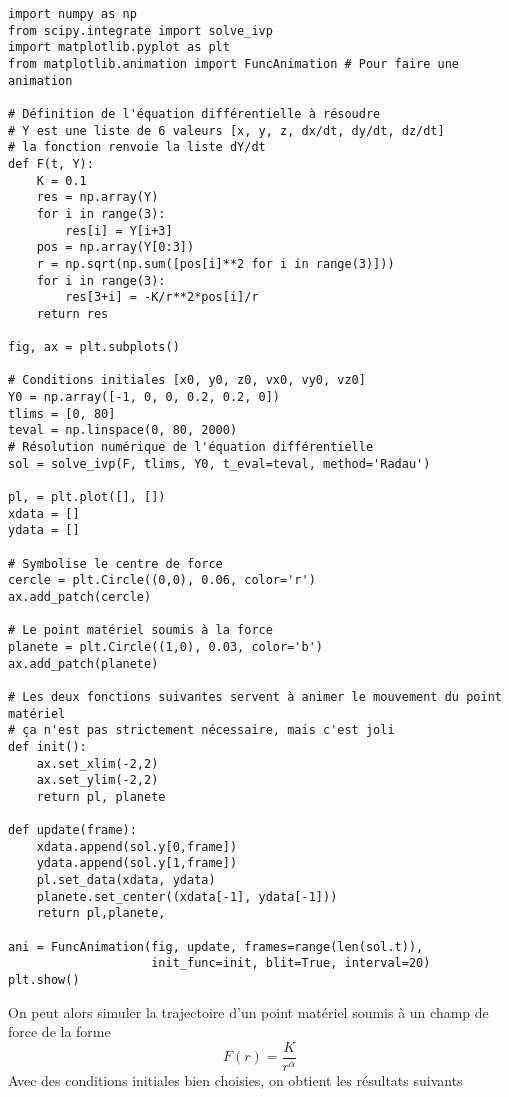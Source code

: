 \documentclass{cours}
\begin{document}
 \begin{verbatim}
import numpy as np
from scipy.integrate import solve_ivp
import matplotlib.pyplot as plt
from matplotlib.animation import FuncAnimation # Pour faire une animation

# Définition de l'équation différentielle à résoudre 
# Y est une liste de 6 valeurs [x, y, z, dx/dt, dy/dt, dz/dt]
# la fonction renvoie la liste dY/dt
def F(t, Y):
    K = 0.1
    res = np.array(Y)
    for i in range(3):
        res[i] = Y[i+3]
    pos = np.array(Y[0:3])
    r = np.sqrt(np.sum([pos[i]**2 for i in range(3)]))
    for i in range(3):
        res[3+i] = -K/r**2*pos[i]/r
    return res

fig, ax = plt.subplots()

# Conditions initiales [x0, y0, z0, vx0, vy0, vz0]
Y0 = np.array([-1, 0, 0, 0.2, 0.2, 0])
tlims = [0, 80]
teval = np.linspace(0, 80, 2000)
# Résolution numérique de l'équation différentielle
sol = solve_ivp(F, tlims, Y0, t_eval=teval, method='Radau')

pl, = plt.plot([], [])
xdata = []
ydata = []

# Symbolise le centre de force
cercle = plt.Circle((0,0), 0.06, color='r')
ax.add_patch(cercle)

# Le point matériel soumis à la force
planete = plt.Circle((1,0), 0.03, color='b')
ax.add_patch(planete)

# Les deux fonctions suivantes servent à animer le mouvement du point matériel
# ça n'est pas strictement nécessaire, mais c'est joli
def init():
    ax.set_xlim(-2,2)
    ax.set_ylim(-2,2)
    return pl, planete

def update(frame):
    xdata.append(sol.y[0,frame])
    ydata.append(sol.y[1,frame])
    pl.set_data(xdata, ydata)
    planete.set_center((xdata[-1], ydata[-1]))
    return pl,planete,

ani = FuncAnimation(fig, update, frames=range(len(sol.t)),
                    init_func=init, blit=True, interval=20)
plt.show()
 \end{verbatim}
On peut alors simuler la trajectoire d'un point matériel soumis à un champ de force de la forme
\begin{equation}
  F(r) = \frac{K}{r^\alpha}
\end{equation}
Avec des conditions initiales bien choisies, on obtient les résultats suivants
\end{document}
